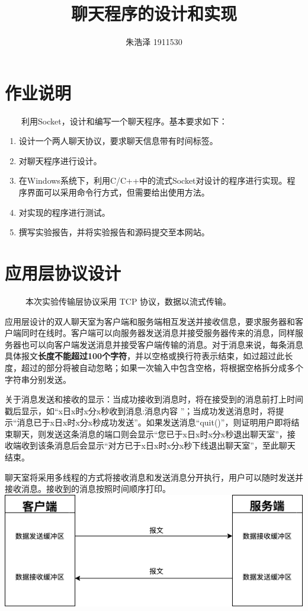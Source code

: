 \documentclass{article}
\begin{document}
\title{聊天程序的设计和实现}
\author{朱浩泽 1911530}
\maketitle
\section{作业说明}
\large \ \ \ \ 利用Socket，设计和编写一个聊天程序。基本要求如下：
\begin{enumerate}
  \item 设计一个两人聊天协议，要求聊天信息带有时间标签。
  \item 对聊天程序进行设计。
  \item 在Windows系统下，利用C/C++中的流式Socket对设计的程序进行实现。程序界面可以采用命令行方式，但需要给出使用方法。
  \item 对实现的程序进行测试。
  \item 撰写实验报告，并将实验报告和源码提交至本网站。
\end{enumerate}
\section{应用层协议设计}
\large
\ \ \ \ \ 本次实验传输层协议采用 TCP 协议，数据以流式传输。
\par
应用层设计的双人聊天室为客户端和服务端相互发送并接收信息，要求服务器和客户端同时在线时。客户端可以向服务器发送消息并接受服务器传来的消息，同样服务器也可以向客户端发送消息并接受客户端传输的消息。对于消息来说，每条消息具体报文\textbf{长度不能超过100个字符}，并以空格或换行符表示结束，如过超过此长度，超过的部分将被自动忽略；如果一次输入中包含空格，将根据空格拆分成多个字符串分别发送。
\par
关于消息发送和接收的显示：当成功接收到消息时，将在接受到的消息前打上时间戳后显示，如“x日x时x分x秒收到消息:消息内容 ”；当成功发送消息时，将提示“消息已于x日x时x分x秒成功发送”。如果发送消息“quit()”，则证明用户即将结束聊天，则发送这条消息的端口则会显示“您已于x日x时x分x秒退出聊天室”，接收端收到该条消息后会显示“对方已于x日x时x分x秒下线退出聊天室”，至此聊天结束。
\par
聊天室将采用多线程的方式将接收消息和发送消息分开执行，用户可以随时发送并接收消息。接收到的消息按照时间顺序打印。\\
\includegraphics[scale=1.0]{1.png}
\\ 
\\ 
\end{document}
